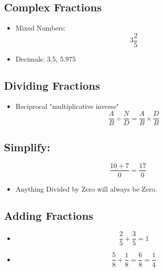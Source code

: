 \documentclass[]{article}
\begin{document}
\subsection{Complex Fractions}
\begin{itemize}
	\item Mixed Numbers:
	\begin{equation}
	3 \frac{2}{5}
	\end{equation}
	\item Decimals:  3.5, 5.975
\end{itemize}

\subsection{Dividing  Fractions}
\begin{itemize}
	\item Reciprocal "multiplicative inverse"
	\begin{equation}
		\frac{A}{B} \div \frac{N}{D}  =  \frac{A}{B} \times \frac{D}{B}		
	\end{equation}
\end{itemize}

\subsection{Simplify:}
\begin{equation}
	\frac {10+7}{0} = \frac{17}{0}
\end{equation}
\begin{itemize}
	\item Anything Divided by Zero will always be Zero.
\end{itemize}

\subsection{Adding Fractions}
\begin{itemize}
	\item \begin{equation}
	\frac {2}{5} + \frac{3}{5} = 1
	\end{equation}
	\item \begin{equation}
		\frac{5}{8} + \frac{1}{8} = \frac{6}{8} = \frac{1}{4}
	\end{equation}
	
\end{itemize}
\end{document}
